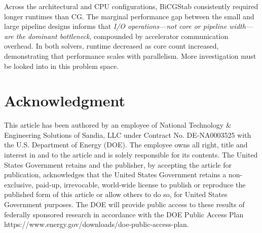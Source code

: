 \documentclass[sigconf, review]{acmart}
\begin{document}


Across the architectural and CPU configurations, BiCGStab consistently required longer runtimes than CG.
The marginal performance gap between the small and large pipeline designs informs that \emph{I/O operations—not core or pipeline width—are the dominant bottleneck}, compounded by accelerator communication overhead.
In both solvers, runtime decreased as core count increased, demonstrating that performance scales with parallelism. More investigation must be looked into in this problem space.





\section*{Acknowledgment}
This article has been authored by an employee of National Technology \& Engineering Solutions of Sandia, LLC under Contract No. DE-NA0003525 with the U.S. Department of Energy (DOE). The employee owns all right, title and interest in and to the article and is solely responsible for its contents. The United States Government retains and the publisher, by accepting the article for publication, acknowledges that the United States Government retains a non-exclusive, paid-up, irrevocable, world-wide license to publish or reproduce the published form of this article or allow others to do so, for United States Government purposes. The DOE will provide public access to these results of federally sponsored research in accordance with the DOE Public Access Plan https://www.energy.gov/downloads/doe-public-access-plan.



\end{document}
